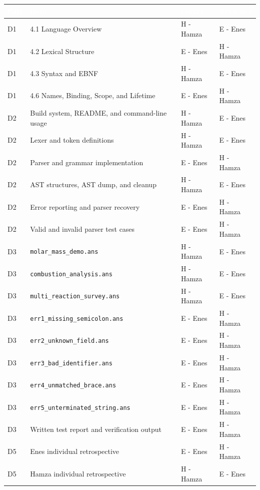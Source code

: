\documentclass[10pt,a4paper]{article}
\newcommand{\code}[1]{\texttt{#1}}
\newcommand{\ownerE}{Enes}
\newcommand{\ownerH}{Hamza}
\begin{document}
\vspace{3pt}
\small
\begin{tabularx}{\textwidth}{@{} L{1.25cm} Y L{2.0cm} L{2.0cm} @{}}
\toprule
{}
\textcolor{white}{\textbf{Part}} &
\textcolor{white}{\textbf{Item}} &
\textcolor{white}{\textbf{Owner}} &
\textcolor{white}{\textbf{Reviewer}} \\
\midrule
D1 & 4.1 Language Overview & H - \ownerH & E - \ownerE \\
D1 & 4.2 Lexical Structure & E - \ownerE & H - \ownerH \\
D1 & 4.3 Syntax and EBNF & H - \ownerH & E - \ownerE \\
D1 & 4.6 Names, Binding, Scope, and Lifetime & E - \ownerE & H - \ownerH \\
\midrule
D2 & Build system, README, and command-line usage & H - \ownerH & E - \ownerE \\
D2 & Lexer and token definitions & H - \ownerH & E - \ownerE \\
D2 & Parser and grammar implementation & E - \ownerE & H - \ownerH \\
D2 & AST structures, AST dump, and cleanup & H - \ownerH & E - \ownerE \\
D2 & Error reporting and parser recovery & E - \ownerE & H - \ownerH \\
D2 & Valid and invalid parser test cases & E - \ownerE & H - \ownerH \\
\midrule
D3 & \code{molar\_mass\_demo.ans} & H - \ownerH & E - \ownerE \\
D3 & \code{combustion\_analysis.ans} & H - \ownerH & E - \ownerE \\
D3 & \code{multi\_reaction\_survey.ans} & H - \ownerH & E - \ownerE \\
D3 & \code{err1\_missing\_semicolon.ans} & E - \ownerE & H - \ownerH \\
D3 & \code{err2\_unknown\_field.ans} & E - \ownerE & H - \ownerH \\
D3 & \code{err3\_bad\_identifier.ans} & E - \ownerE & H - \ownerH \\
D3 & \code{err4\_unmatched\_brace.ans} & E - \ownerE & H - \ownerH \\
D3 & \code{err5\_unterminated\_string.ans} & E - \ownerE & H - \ownerH \\
D3 & Written test report and verification output & E - \ownerE & H - \ownerH \\
\midrule
D5 & Enes individual retrospective & E - \ownerE & H - \ownerH \\
D5 & Hamza individual retrospective & H - \ownerH & E - \ownerE \\
\bottomrule
\end{tabularx}
\end{document}
